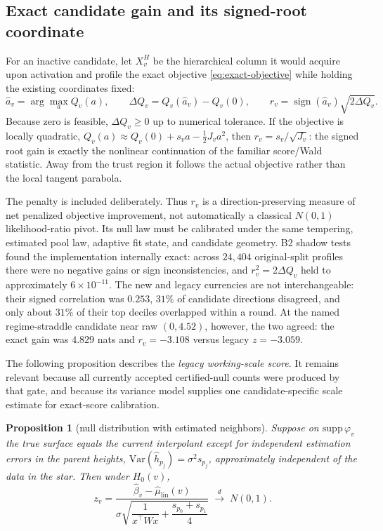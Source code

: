 \documentclass[11pt]{article}
\newtheorem{proposition}{Proposition}[section]
\newcommand{\Var}{\mathrm{Var}}
\begin{document}
\subsection{Exact candidate gain and its signed-root coordinate}\label{sec:exactgain}
For an inactive candidate, let $X^H_v$ be the hierarchical column it would acquire upon activation
and profile the exact objective \eqref{eq:exact-objective} while holding the existing coordinates
fixed:
\begin{equation}\label{eq:exactgain}
\hat a_v=\arg\max_a Q_v(a),
\qquad
\Delta Q_v=Q_v(\hat a_v)-Q_v(0),
\qquad
r_v=\operatorname{sign}(\hat a_v)\sqrt{2\Delta Q_v}.
\end{equation}
Because zero is feasible, $\Delta Q_v\ge0$ up to numerical tolerance. If the objective is locally
quadratic, $Q_v(a)\approx Q_v(0)+s_va-\tfrac12J_va^2$, then
$r_v=s_v/\sqrt{J_v}$: the signed root gain is exactly the nonlinear continuation of the familiar
score/Wald statistic. Away from the trust region it follows the actual objective rather than the
local tangent parabola.

The penalty is included deliberately. Thus $r_v$ is a direction-preserving measure of net
penalized objective improvement, not automatically a classical $N(0,1)$ likelihood-ratio pivot. Its
null law must be calibrated under the same tempering, estimated pool law, adaptive fit state, and
candidate geometry. B2 shadow tests found the implementation internally exact: across $24{,}404$
original-split profiles there were no negative gains or sign inconsistencies, and
$r_v^2=2\Delta Q_v$ held to approximately $6\times10^{-11}$. The new and legacy currencies are not
interchangeable: their signed correlation was $0.253$, $31\%$ of candidate directions disagreed,
and only about $31\%$ of their top deciles overlapped within a round. At the named regime-straddle
candidate near raw $(0,4.52)$, however, the two agreed: the exact gain was $4.829$ nats and
$r_v=-3.108$ versus legacy $z=-3.059$.

The following proposition describes the \emph{legacy working-scale score}. It remains relevant
because all currently accepted certified-null counts were produced by that gate, and because its
variance model supplies one candidate-specific scale estimate for exact-score calibration.

\begin{proposition}[null distribution with estimated neighbors]\label{prop:null}
Suppose on $\mathrm{supp}\,\varphi_v$ the true surface equals the current interpolant
except for independent estimation errors in the parent heights,
$\Var(\hat h_{p_j})=\sigma^2 s_{p_j}$, approximately independent of the data in the
star. Then under $H_0(v)$,
\begin{equation}\label{eq:z}
z_v=\frac{\hat\beta_v-\hat\mu_{\mathrm{lin}}(v)}
{\sigma\sqrt{\dfrac{1}{x^\top Wx}+\dfrac{s_{p_0}+s_{p_1}}{4}}}
\;\xrightarrow{\ d\ }\;N(0,1).
\end{equation}
\end{proposition}
\end{document}
